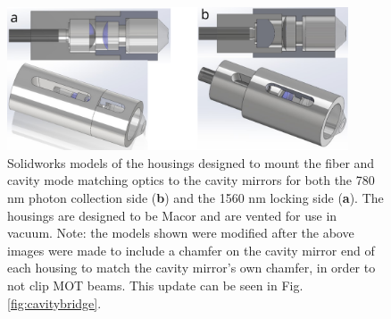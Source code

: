 \begin{figure}[!ht]
    \centering
    \includegraphics[width=0.9\textwidth]{Images/mode_matching_housings.pdf}
    \caption{Solidworks models of the housings designed to mount the fiber and cavity mode matching optics to the cavity mirrors for both the 780 nm photon collection side (\textbf{b}) and the 1560 nm locking side (\textbf{a}). The housings are designed to be Macor and are vented for use in vacuum. Note: the models shown were modified after the above images were made to include a chamfer on the cavity mirror end of each housing to match the cavity mirror's own chamfer, in order to not clip MOT beams. This update can be seen in Fig. \ref{fig:cavitybridge}.}
    \label{fig:modematchhousings}
\end{figure}

